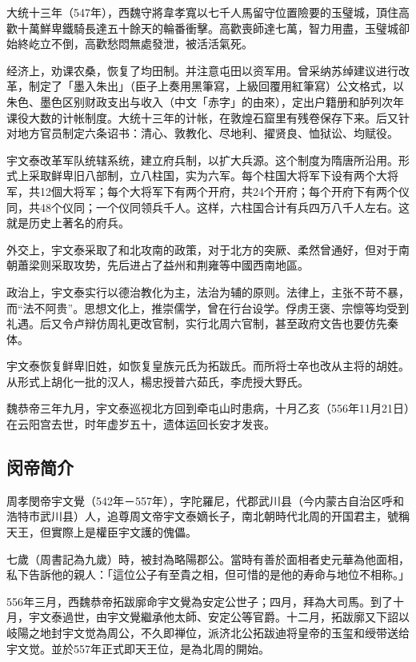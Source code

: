 大统十三年（547年），西魏守將韋孝寬以七千人馬留守位置險要的玉璧城，頂住高歡十萬鮮卑鐵騎長達五十餘天的輪番衝擊。高歡喪師達七萬，智力用盡，玉璧城卻始終屹立不倒，高歡愁悶無處發泄，被活活氣死。

经济上，劝课农桑，恢复了均田制。并注意屯田以资军用。曾采纳苏绰建议进行改革，制定了「墨入朱出」（臣子上奏用黑筆寫，上級回覆用紅筆寫）公文格式，以朱色、墨色区别财政支出与收入（中文「赤字」的由來），定出户籍册和胪列次年课役大数的计帐制度。大统十三年的计帐，在敦煌石窟里有残卷保存下来。后又针对地方官员制定六条诏书：清心、敦教化、尽地利、擢贤良、恤狱讼、均赋役。

宇文泰改革军队统辖系统，建立府兵制，以扩大兵源。这个制度为隋唐所沿用。形式上采取鲜卑旧八部制，立八柱国，实为六军。每个柱国大将军下设有两个大将军，共12個大将军；每个大将军下有两个开府，共24个开府；每个开府下有两个仪同，共48个仪同；一个仪同领兵千人。这样，六柱国合计有兵四万八千人左右。这就是历史上著名的府兵。

外交上，宇文泰采取了和北攻南的政策，对于北方的突厥、柔然曾通好，但对于南朝蕭梁则采取攻势，先后进占了益州和荆雍等中國西南地區。

政治上，宇文泰实行以德治教化为主，法治为辅的原则。法律上，主张不苛不暴，而“法不阿贵”。思想文化上，推崇儒学，曾在行台设学。俘虏王褒、宗懔等均受到礼遇。后又令卢辩仿周礼更改官制，实行北周六官制，甚至政府文告也要仿先秦体。

宇文泰恢复鲜卑旧姓，如恢复皇族元氏为拓跋氏。而所将士卒也改从主将的胡姓。从形式上胡化一批的汉人，楊忠授普六茹氏，李虎授大野氏。

魏恭帝三年九月，宇文泰巡视北方回到牵屯山时患病，十月乙亥（556年11月21日）在云阳宫去世，时年虚岁五十，遗体运回长安才发丧。

\subsection{闵帝简介}

周孝閔帝宇文覺（542年－557年），字陀羅尼，代郡武川县（今内蒙古自治区呼和浩特市武川县）人，追尊周文帝宇文泰嫡长子，南北朝時代北周的开国君主，號稱天王，但實際上是權臣宇文護的傀儡。

七歲（周書記為九歲）時，被封為略陽郡公。當時有善於面相者史元華為他面相，私下告訴他的親人：「這位公子有至貴之相，但可惜的是他的寿命与地位不相称。」

556年三月，西魏恭帝拓跋廓命宇文覺為安定公世子；四月，拜為大司馬。到了十月，宇文泰過世，由宇文覺繼承他太師、安定公等官爵。十二月，拓跋廓又下詔以岐陽之地封宇文觉為周公，不久即禅位，派济北公拓跋迪将皇帝的玉玺和绶带送给宇文觉。並於557年正式即天王位，是為北周的開始。

